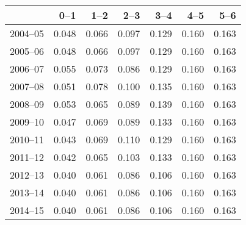 \begin{table}[ht]
\centering
\begin{tabular}{rrrrrrr}
  \hline
 & 0--1 & 1--2 & 2--3 & 3--4 & 4--5 & 5--6 \\ 
  \hline
2004--05 & 0.048 & 0.066 & 0.097 & 0.129 & 0.160 & 0.163 \\ 
  2005--06 & 0.048 & 0.066 & 0.097 & 0.129 & 0.160 & 0.163 \\ 
  2006--07 & 0.055 & 0.073 & 0.086 & 0.129 & 0.160 & 0.163 \\ 
  2007--08 & 0.051 & 0.078 & 0.100 & 0.135 & 0.160 & 0.163 \\ 
  2008--09 & 0.053 & 0.065 & 0.089 & 0.139 & 0.160 & 0.163 \\ 
  2009--10 & 0.047 & 0.069 & 0.089 & 0.133 & 0.160 & 0.163 \\ 
  2010--11 & 0.043 & 0.069 & 0.110 & 0.129 & 0.160 & 0.163 \\ 
  2011--12 & 0.042 & 0.065 & 0.103 & 0.133 & 0.160 & 0.163 \\ 
  2012--13 & 0.040 & 0.061 & 0.086 & 0.106 & 0.160 & 0.163 \\ 
  2013--14 & 0.040 & 0.061 & 0.086 & 0.106 & 0.160 & 0.163 \\ 
  2014--15 & 0.040 & 0.061 & 0.086 & 0.106 & 0.160 & 0.163 \\ 
   \hline
\end{tabular}
\end{table}
